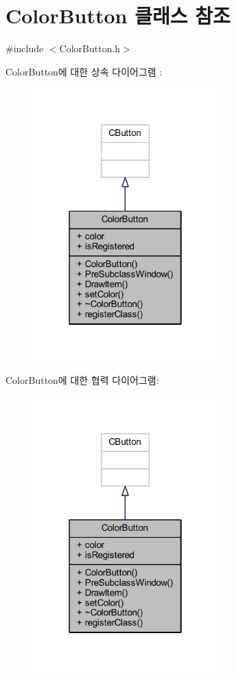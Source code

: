 \hypertarget{class_color_button}{}\section{Color\+Button 클래스 참조}
\label{class_color_button}


{\ttfamily \#include $<$Color\+Button.\+h$>$}



Color\+Button에 대한 상속 다이어그램 \+: \nopagebreak
\begin{figure}[H]
\begin{center}
\leavevmode
\includegraphics[width=202pt]{class_color_button__inherit__graph}
\end{center}
\end{figure}


Color\+Button에 대한 협력 다이어그램\+:\nopagebreak
\begin{figure}[H]
\begin{center}
\leavevmode
\includegraphics[width=202pt]{class_color_button__coll__graph}
\end{center}
\end{figure}
